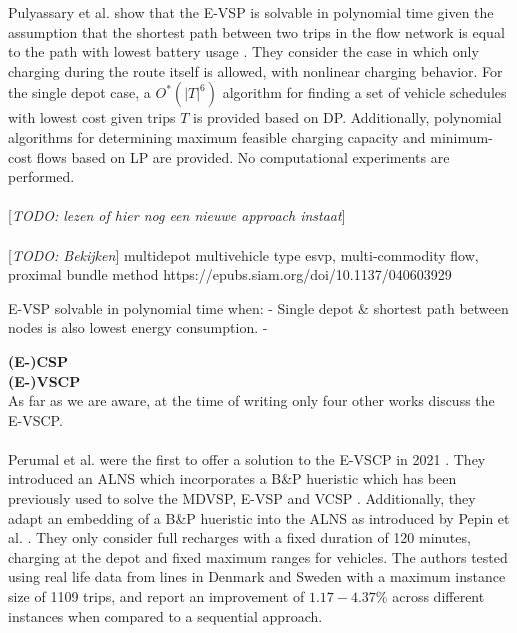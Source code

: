 \documentclass[ht]{article}
\newcommand{\todo}[1]{{\color{red}[\textit{TODO: #1}]}}
\begin{document}
Pulyassary et al. show that the E-VSP is solvable in polynomial time given the assumption that the shortest path between two trips in the flow network is equal to the path with lowest battery usage \cite{Pulyassary2024}. They consider the case in which only charging during the route itself is allowed, with nonlinear charging behavior. For the single depot case, a $O^*(|T|^6)$ algorithm for finding a set of vehicle schedules with lowest cost given trips $T$ is provided based on DP. Additionally, polynomial algorithms for determining maximum feasible charging capacity and minimum-cost flows based on LP are provided. No computational experiments are performed. \\\\

\todo{lezen of hier nog een nieuwe approach instaat} \cite{Sassi2014} \\\\
\todo{Bekijken} multidepot multivehicle type esvp, multi-commodity flow, proximal bundle method https://epubs.siam.org/doi/10.1137/040603929 \cite{Borndörfer2024}



E-VSP solvable in polynomial time when: 
- Single depot \& shortest path between nodes is also lowest energy consumption. 
- \cite{Pulyassary2024}

\noindent \textbf{(E-)CSP}\\

\noindent \textbf{(E-)VSCP}\\
As far as we are aware, at the time of writing only four other works discuss the E-VSCP. \\\\

Perumal et al. were the first to offer a solution to the E-VSCP in 2021 \cite{Perumal2021}. They introduced an ALNS which incorporates a B\&P hueristic which has been previously used to solve the MDVSP, E-VSP and VCSP \cite{Pepin2009, Haase1996, vanKootenNiekerk2017}. Additionally, they adapt an embedding of a B\&P hueristic into the ALNS as introduced by Pepin et al. \cite{Pepin2009}. They only consider full recharges with a fixed duration of 120 minutes, charging at the depot and fixed maximum ranges for vehicles. The authors tested using real life data from lines in Denmark and Sweden with a maximum instance size of 1109 trips, and report an improvement of $1.17-4.37\%$ across different instances when compared to a sequential approach. \\\\
\end{document}

